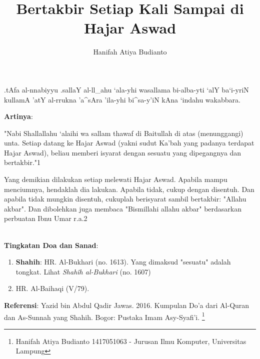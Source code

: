 \documentclass[a4paper,12pt]{article}
\title{\Large Bertakbir Setiap Kali Sampai di Hajar Aswad}
\author{\calligra Hanifah Atiya Budianto}
\begin{document}
\sffamily
\maketitle 
\fullvocalize
{}
\begin{arabtext}
\noindent
.tAfa al-nnabiyyu .sallaY al-ll_ahu `ala-yhi wasallama bi-alba-yti `alY 
ba`i-yriN kullamA 'atY al-rrukna 'a^sAra 'ila-yhi bi^sa-y'iN kAna `indahu 
wakabbara.\\
\end{arabtext}
\noindent
\textbf{Artinya}:
\par
\indent
"Nabi Shallallahu ‘alaihi wa sallam thawaf di Baitullah di atas 
(menunggangi) unta. Setiap datang ke Hajar Aswad (yakni sudut Ka'bah yang 
padanya terdapat Hajar Aswad), beliau memberi isyarat dengan sesuatu yang 
dipegangnya dan bertakbir."{\scriptsize 1}\\
\par
\indent
Yang demikian dilakukan setiap melewati Hajar Aswad. Apabila mampu 
menciumnya, hendaklah dia lakukan. Apabila tidak, cukup dengan disentuh. 
Dan apabila tidak mungkin disentuh, cukuplah berisyarat sambil bertakbir: 
"Allahu akbar". Dan dibolehkan juga membaca "Bismillahi allahu akbar" 
berdasarkan perbuatan Ibnu Umar r.a.{\scriptsize 2}\\\\
\par
\noindent
\textbf{Tingkatan Doa dan Sanad}:
\begin{enumerate}
\item \textbf{Shahih}: HR. Al-Bukhari (no. 1613). Yang dimaksud "sesuatu" 
adalah tongkat. Lihat \textit{Shah\^{i}h al-Bukhari} (no. 1607)
\item HR. Al-Baihaqi (V/79).
\end{enumerate}
\textbf{Referensi}: Yazid bin Abdul Qadir Jawas. 2016. Kumpulan Do'a dari
Al-Quran dan As-Sunnah yang Shahih. Bogor: Pustaka Imam Asy-Syafi'i.
\footnote{Hanifah Atiya Budianto 1417051063 - Jurusan Ilmu Komputer,
Universitas Lampung}
\end{document}
